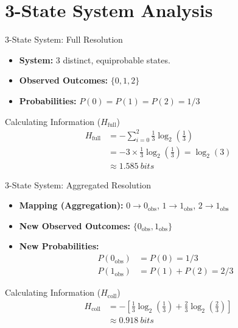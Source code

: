 \documentclass{beamer}
\newcommand{\Hfull}{H_{\text{full}}}
\newcommand{\Hcoll}{H_{\text{coll}}}
\newcommand{\obs}[1]{#1_{\text{obs}}} %
\begin{document}
\section{3-State System Analysis}
\begin{frame}{3-State System: Full Resolution}
    \begin{itemize}
        \item \textbf{System:} 3 distinct, equiprobable states.
        \item \textbf{Observed Outcomes:} $\{0, 1, 2\}$
        \item \textbf{Probabilities:} $P(0) = P(1) = P(2) = 1/3$
    \end{itemize}
    \pause
    \begin{block}{Calculating Information ($\Hfull$)}
        \begin{align*}
            \Hfull &= - \sum_{i=0}^{2} \frac{1}{3} \log_2 \left(\frac{1}{3}\right) \\
            &= -3 \times \frac{1}{3} \log_2 \left(\frac{1}{3}\right) = \log_2(3) \\
            &\approx \SI{1.585}{bits}
        \end{align*}
    \end{block}
\end{frame}

\begin{frame}{3-State System: Aggregated Resolution}
    \begin{itemize}
        \item \textbf{Mapping (Aggregation):}
             $0 \to \obs{0}$, \quad $1 \to \obs{1}$, \quad $2 \to \obs{1}$
        \item \textbf{New Observed Outcomes:} $\{\obs{0}, \obs{1}\}$
        \item \textbf{New Probabilities:}
            \begin{align*}
                P(\obs{0}) &= P(0) = 1/3 \\
                P(\obs{1}) &= P(1) + P(2) = 2/3
            \end{align*}
    \end{itemize}
    \pause
    \begin{block}{Calculating Information ($\Hcoll$)}
        \begin{align*}
            \Hcoll &= - \left[ \frac{1}{3} \log_2 \left(\frac{1}{3}\right) + \frac{2}{3} \log_2 \left(\frac{2}{3}\right) \right] \\
            &\approx \SI{0.918}{bits}
        \end{align*}
    \end{block}
\end{frame}
\end{document}
